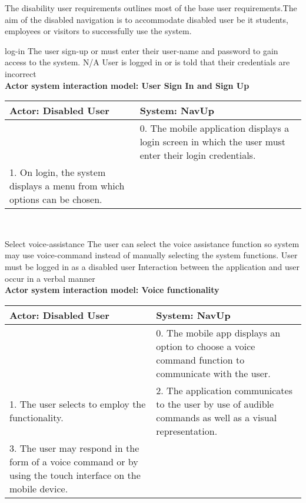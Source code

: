 The disability user requirements outlines most of the base user requirements.The aim of the disabled navigation is to accommodate disabled user be it students, employees or visitors to successfully use the system.

\FuncReq 
{log-in }
{The user sign-up or must enter their user-name and password to gain access to the system. }
 {N/A}
 {User is logged in or is told that their credentials are incorrect}
     \\
    \textbf{Actor system interaction model: User Sign In and Sign Up }\\
    \begin{tabular}{ | p{6cm} | p{6cm} |}
    \hline
    Actor: Disabled User & System: NavUp \\ \hline
     & 0. The mobile application displays a login screen in which the user must enter their login credentials.\\ \hline
    1. On login, the system displays a menu from which options can be chosen. &\\ \hline   
    \end{tabular}
\\
\bigskip

\FuncReq
{Select voice-assistance }
{The user can select the voice assistance function so system may use voice-command instead of manually selecting the system functions.}
{User must be logged in as a disabled user}
{Interaction between the application and user occur in a verbal manner}
    \\
    \textbf{Actor system interaction model: Voice functionality }\\
    \begin{tabular}{ | p{6cm} | p{6cm} |}
    \hline
    Actor: Disabled User & System: NavUp \\ \hline
     & 0. The mobile app displays an option to choose a voice command function to communicate with the user.\\ \hline
    1. The user selects to employ the functionality. & 2. The application communicates to the user by use of audible commands as well as a visual representation.\\ \hline
    3. The user may respond in the form of a voice command or by using the touch interface on the mobile device. & \\ \hline
    
    \end{tabular}
\\
\bigskip

